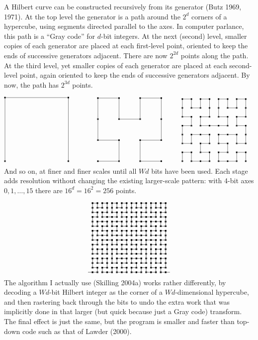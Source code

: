 A Hilbert curve can be constructed recursively from its generator (Butz 1969, 1971).  
At the top level the generator is a path around the $2^d$ corners of a hypercube, using segments directed parallel to the axes.  
In computer parlance, this path is a ``Gray code'' for $d$-bit integers.
At the next (second) level, smaller copies of each generator are placed at each first-level point, oriented to keep the ends of successive generators adjacent.
There are now $2^{2d}$ points along the path.
At the third level, yet smaller copies of each generator are placed at each second-level point, again oriented to keep the ends of successive generators adjacent.
By now, the path has $2^{3d}$ points.

$$
\vbox{\lineskip = -0.4pt \baselineskip = 0pt
      \hbox{\Za\Oa}
      \hbox{\Ia\Ia}
     }
\hskip -56pt
\vbox{\lineskip = -0.4pt \baselineskip = 0pt
      \hbox{\Zb\Ob\Zb\Ob}
      \hbox{\Ib\Lb\Ib\Ib}
      \hbox{\Lb\Ob\Zb\Ib}
      \hbox{\Zb\Ib\Lb\Ob}
     }
\vbox{\lineskip = -0.4pt \baselineskip = 0pt
      \hbox{\Zc\Oc\Zc\Oc\Zc\Oc\Zc\Oc}
      \hbox{\Ic\Lc\Ic\Ic\Ic\Lc\Ic\Ic}
      \hbox{\Lc\Oc\Zc\Ic\Lc\Oc\Zc\Ic}
      \hbox{\Zc\Ic\Lc\Zc\Zc\Ic\Lc\Oc}
      \hbox{\Ic\Zc\Zc\Oc\Zc\Zc\Oc\Ic}
      \hbox{\Lc\Ic\Zc\Ic\Lc\Oc\Lc\Ic}
      \hbox{\Zc\Oc\Lc\Oc\Zc\Ic\Zc\Oc}
      \hbox{\Ic\Lc\Zc\Ic\Lc\Zc\Ic\Ic}
     }
$$
And so on, at finer and finer scales until all $Wd$ bits have been used.
Each stage adds resolution without changing the existing larger-scale pattern: with 4-bit axes $0,1,\ldots,15$ there are $16^d = 16^2 = 256$ points.

$$
\hbox{
{\vrule height 0.4pt width 6pt depth 0pt} \hskip -4pt
\vbox{\lineskip = -0.4pt \baselineskip = 0pt
      \hbox{\Zd\Od\Zd\Od\Zd\Od\Zd\Od\Zd\Od\Zd\Od\Zd\Od\Zd\Od}
      \hbox{\Id\Ld\Id\Id\Id\Ld\Id\Id\Id\Ld\Id\Id\Id\Ld\Id\Id}
      \hbox{\Ld\Od\Zd\Id\Ld\Od\Zd\Id\Ld\Od\Zd\Id\Ld\Od\Zd\Id}
      \hbox{\Zd\Id\Ld\Zd\Zd\Id\Ld\Od\Zd\Id\Ld\Zd\Zd\Id\Ld\Od}
      \hbox{\Id\Zd\Zd\Od\Zd\Zd\Od\Id\Id\Zd\Zd\Od\Zd\Zd\Od\Id}
      \hbox{\Ld\Id\Zd\Id\Ld\Od\Ld\Id\Ld\Id\Zd\Id\Ld\Od\Ld\Id}
      \hbox{\Zd\Od\Ld\Od\Zd\Id\Zd\Od\Zd\Od\Ld\Od\Zd\Id\Zd\Od}
      \hbox{\Id\Ld\Zd\Id\Ld\Zd\Id\Ld\Id\Ld\Zd\Id\Ld\Zd\Id\Id}
      \hbox{\Ld\Od\Zd\Zd\Od\Zd\Zd\Od\Zd\Zd\Od\Zd\Zd\Od\Zd\Id}
      \hbox{\Zd\Id\Ld\Od\Ld\Id\Zd\Id\Ld\Od\Ld\Id\Zd\Id\Ld\Od}
      \hbox{\Id\Zd\Od\Id\Zd\Od\Ld\Od\Zd\Id\Zd\Od\Id\Zd\Od\Id}
      \hbox{\Ld\Id\Ld\Id\Id\Ld\Zd\Id\Ld\Zd\Id\Id\Ld\Id\Ld\Id}
      \hbox{\Zd\Od\Zd\Od\Id\Zd\Zd\Od\Zd\Zd\Od\Id\Zd\Od\Zd\Od}
      \hbox{\Id\Ld\Id\Id\Ld\Id\Zd\Id\Ld\Od\Ld\Id\Id\Ld\Id\Id}
      \hbox{\Ld\Od\Zd\Id\Zd\Od\Ld\Od\Zd\Id\Zd\Od\Ld\Od\Zd\Id}
      \hbox{\Zd\Id\Ld\Zd\Id\Ld\Zd\Id\Ld\Zd\Id\Ld\Zd\Id\Ld\Od}
     }
\hskip -9pt {\vrule height 0.4pt width 6pt depth 0pt}
     }
$$
The algorithm I actually use (Skilling 2004a) works rather differently, by decoding a $Wd$-bit Hilbert integer as the corner of a $Wd$-dimensional hypercube,
and then rastering back through the bits to undo the extra work that was implicitly done in that larger (but quick because just a Gray code) transform.
The final effect is just the same, but the program is smaller and faster than top-down code such as that of Lawder (2000).

